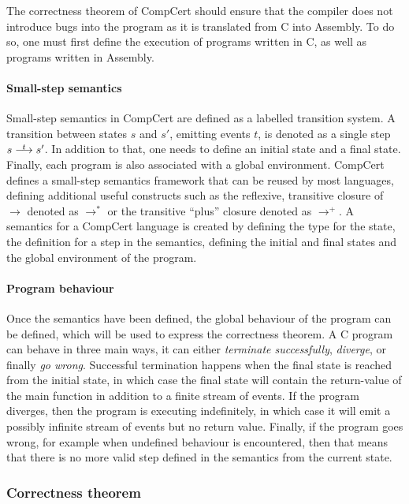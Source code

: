 The correctness theorem of CompCert should ensure that the compiler does not
introduce bugs into the program as it is translated from C into Assembly.  To do
so, one must first define the execution of programs written in C, as well as
programs written in Assembly.

\paragraph{Small-step semantics}

Small-step semantics in CompCert are defined as a labelled transition system.  A
transition between states $s$ and $s'$, emitting events $t$, is denoted as a
single step $s \oset{t}{\longrightarrow} s'$.  In addition to that, one needs to
define an initial state and a final state.  Finally, each program is also
associated with a global environment.  CompCert defines a small-step semantics
framework that can be reused by most languages, defining additional useful
constructs such as the reflexive, transitive closure of $\longrightarrow$
denoted as $\longrightarrow^{*}$ or the transitive \enquote{plus} closure
denoted as $\longrightarrow^{+}$.  A semantics for a CompCert language is
created by defining the type for the state, the definition for a step in the
semantics, defining the initial and final states and the global environment of
the program.

\paragraph{Program behaviour}

Once the semantics have been defined, the global behaviour of the program can be
defined, which will be used to express the correctness theorem.  A C program can
behave in three main ways, it can either \emph{terminate successfully},
\emph{diverge}, or finally \emph{go wrong}.  Successful termination happens when
the final state is reached from the initial state, in which case the final state
will contain the return-value of the main function in addition to a finite
stream of events.  If the program diverges, then the program is executing
indefinitely, in which case it will emit a possibly infinite stream of events
but no return value.  Finally, if the program goes wrong, for example when
undefined behaviour is encountered, then that means that there is no more valid
step defined in the semantics from the current state.

\subsubsection{Correctness theorem}

